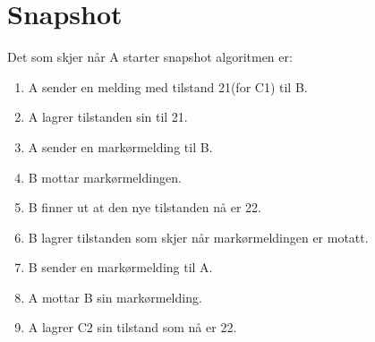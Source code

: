 \documentclass{article}
\begin{document}
\section{Snapshot}
Det som skjer når A starter snapshot algoritmen er:
\begin{enumerate}
	\item A sender en melding med tilstand 21(for C1) til B.
	\item A lagrer tilstanden sin til 21.
	\item A sender en markørmelding til B.
	\item B mottar markørmeldingen.
	\item B finner ut at den nye tilstanden nå er 22.
	\item B lagrer tilstanden som skjer når markørmeldingen er motatt.
	\item B sender en markørmelding til A.
	\item A mottar B sin markørmelding.
	\item A lagrer C2 sin tilstand som nå er 22.
\end{enumerate}
\end{document}
